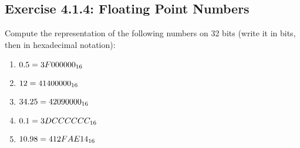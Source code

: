 \documentclass[12pt, a4paper, oneside]{article}
\begin{document}
\subsection{Exercise 4.1.4: Floating Point Numbers}
Compute the representation of the following numbers on 32 bits (write it in bits, then in hexadecimal notation):
\begin{enumerate}[$\bullet$]
  \item $0.5 \hfill = 3F00 0000_{16}$
  \item $12 \hfill = 4140 0000_{16}$
  \item $34.25 \hfill = 4209 0000_{16}$
  \item $0.1 \hfill = 3DCC CCCC_{16}$
  \item $10.98 \hfill = 412FAE14_{16}$
\end{enumerate}
\end{document}
